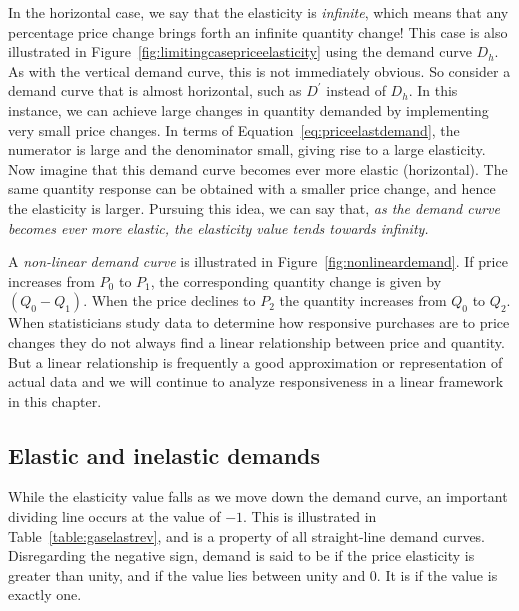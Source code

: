 

\newhtmlpage

In the horizontal case, we say that the elasticity is \textit{infinite},
which means that any percentage price change brings forth an infinite
quantity change! This case is also illustrated in Figure~\ref{fig:limitingcasepriceelasticity}
using the demand curve $D_h$. As with the
vertical demand curve, this is not immediately obvious. So consider a demand
curve that is almost horizontal, such as $D^{\prime}$ instead of $D_h$. In
this instance, we can achieve large changes in quantity demanded by
implementing very small price changes. In terms of Equation~\ref{eq:priceelastdemand},
the numerator is large and the denominator small,
giving rise to a large elasticity. Now imagine that this demand curve
becomes ever more elastic (horizontal). The same quantity response can be
obtained with a smaller price change, and hence the elasticity is larger.
Pursuing this idea, we can say that, \textit{as the demand curve becomes
ever more elastic, the elasticity value tends towards infinity.}

A \textit{non-linear demand curve} is illustrated in Figure~\ref{fig:nonlineardemand}.
If price increases from $P_0$ to $P_1$, the
corresponding quantity change is given by $(Q_0-Q_1)$. When the price
declines to $P_2$ the quantity increases from $Q_0$ to $Q_2$. When
statisticians study data to determine how responsive purchases are to price
changes they do not always find a linear relationship between price and
quantity. But a linear relationship is frequently a good approximation or
representation of actual data and we will continue to analyze responsiveness
in a linear framework in this chapter.



\newhtmlpage

\subsection*{Elastic and inelastic demands}

While the elasticity value falls as we move down the demand curve, an
important dividing line occurs at the value of $-1$. This is illustrated in
Table~\ref{table:gaselastrev}, and is a property of all straight-line demand
curves. Disregarding the negative sign, demand is said to be %
 if the price elasticity is greater than unity, and %
 if the value lies between unity and 0. It is %
 if the value is exactly one.

